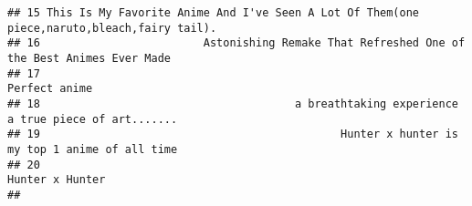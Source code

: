 \documentclass[
]{article}
\begin{document}
\begin{verbatim}
## 15 This Is My Favorite Anime And I've Seen A Lot Of Them(one piece,naruto,bleach,fairy tail).
## 16                         Astonishing Remake That Refreshed One of the Best Animes Ever Made
## 17                                                                              Perfect anime
## 18                                       a breathtaking experience a true piece of art.......
## 19                                              Hunter x hunter is my top 1 anime of all time
## 20                                                                            Hunter x Hunter
##                                                                                                                                                                                                                                                                                                                                                                                                                                                                                                                                                                                                                                                                                                                                                                                                                                                                                                                                                                                                                                                                                                                                                                                                                                                                                                                                                                                                                                                                                                                                                                                                                                                                                                                                                                                                                                                                                                                                                                                                                                                                                                                                                                                                                                                                                                                                                                                                                                                                                                                                                                                                                                                                                                                                                                                                                                               
\end{verbatim}
\end{document}
